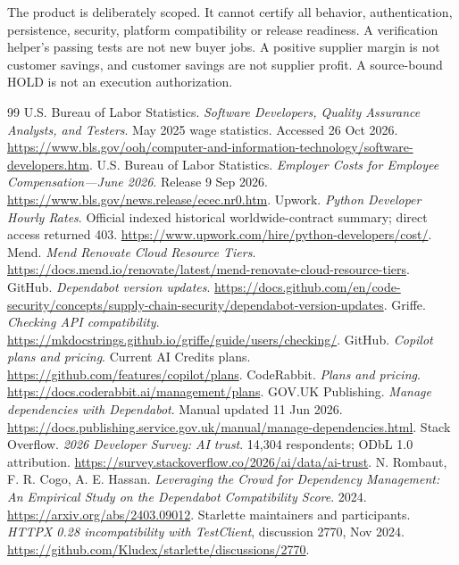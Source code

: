 \documentclass[11pt,a4paper]{article}
\begin{document}
The product is deliberately scoped. It cannot certify all behavior, authentication, persistence,
security, platform compatibility or release readiness. A verification helper's passing tests
are not new buyer jobs. A positive supplier margin is not customer savings, and customer savings
are not supplier profit. A source-bound HOLD is not an execution authorization.

\newpage
\begin{thebibliography}{99}
\small
{} U.S. Bureau of Labor Statistics. \emph{Software Developers, Quality Assurance Analysts, and Testers}.
May 2025 wage statistics. Accessed 26 Oct 2026.
\url{https://www.bls.gov/ooh/computer-and-information-technology/software-developers.htm}.
 U.S. Bureau of Labor Statistics. \emph{Employer Costs for Employee Compensation---June 2026}.
Release 9 Sep 2026. \url{https://www.bls.gov/news.release/ecec.nr0.htm}.
 Upwork. \emph{Python Developer Hourly Rates}.
Official indexed historical worldwide-contract summary; direct access returned 403.
\url{https://www.upwork.com/hire/python-developers/cost/}.
 Mend. \emph{Mend Renovate Cloud Resource Tiers}.
\url{https://docs.mend.io/renovate/latest/mend-renovate-cloud-resource-tiers}.
 GitHub. \emph{Dependabot version updates}.
\url{https://docs.github.com/en/code-security/concepts/supply-chain-security/dependabot-version-updates}.
 Griffe. \emph{Checking API compatibility}.
\url{https://mkdocstrings.github.io/griffe/guide/users/checking/}.
 GitHub. \emph{Copilot plans and pricing}.
Current AI Credits plans. \url{https://github.com/features/copilot/plans}.
 CodeRabbit. \emph{Plans and pricing}.
\url{https://docs.coderabbit.ai/management/plans}.
 GOV.UK Publishing. \emph{Manage dependencies with Dependabot}.
Manual updated 11 Jun 2026.
\url{https://docs.publishing.service.gov.uk/manual/manage-dependencies.html}.
 Stack Overflow. \emph{2026 Developer Survey: AI trust}.
14,304 respondents; ODbL 1.0 attribution.
\url{https://survey.stackoverflow.co/2026/ai/data/ai-trust}.
 N. Rombaut, F. R. Cogo, A. E. Hassan.
\emph{Leveraging the Crowd for Dependency Management: An Empirical Study on the Dependabot Compatibility Score}. 2024.
\url{https://arxiv.org/abs/2403.09012}.
 Starlette maintainers and participants.
\emph{HTTPX 0.28 incompatibility with TestClient}, discussion 2770, Nov 2024.
\url{https://github.com/Kludex/starlette/discussions/2770}.

\end{thebibliography}
\end{document}
